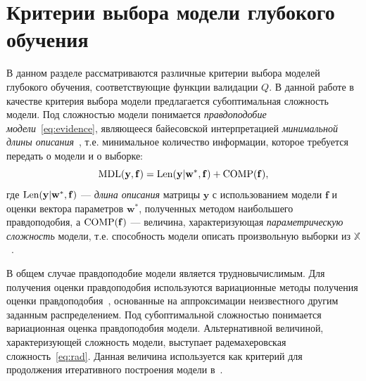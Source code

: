 \section{Критерии выбора модели глубокого обучения}
В данном разделе рассматриваются различные критерии выбора моделей глубокого обучения, соответствующие функции валидации $Q$.
В данной работе в качестве критерия выбора модели предлагается субоптимальная сложность модели. Под сложностью модели понимается \emph{правдоподобие модели}~\eqref{eq:evidence}, являющееся байесовской интерпретацией \emph{минимальной длины описания}~\cite{mdl}, т.е. минимальное количество информации, которое требуется передать о модели и о выборке:
\begin{equation}
\label{eq:mdl}
	\textnormal{MDL}(\mathbf{y},\mathbf{f}) = \textnormal{Len}(\mathbf{y}|\mathbf{w}^{*}, \mathbf{f}) + \textnormal{COMP}(\mathbf{f}),
\end{equation}
где  $\textnormal{Len}(\mathbf{y}|\mathbf{w}^{*}, \mathbf{f})$ --- \emph{длина описания} матрицы $\mathbf{y}$ с использованием модели $\mathbf{f}$ и оценки вектора параметров $\mathbf{w}^{*}$, полученных методом наибольшего правдоподобия, а $\textnormal{COMP}(\mathbf{f})$ --- величина, характеризующая \emph{параметрическую сложность} модели, т.е. способность модели описать произвольную выборки из $\mathbb{X}$~\cite{mdl}.

{В общем случае правдоподобие модели является трудновычислимым.} Для получения оценки правдоподобия используются вариационные методы получения оценки правдоподобия~\cite{bishop}, основанные на аппроксимации неизвестного другим заданным распределением. Под субоптимальной сложностью понимается вариационная оценка правдоподобия модели.
Альтернативной величиной, характеризующей сложность модели, выступает радемахеровская сложность~\eqref{eq:rad}. Данная величина используется как критерий для продолжения итеративного построения модели в~\cite{adanet}.

